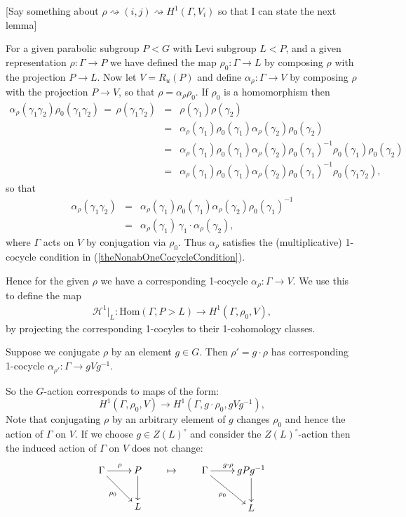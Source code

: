 [Say something about $\rho \rightsquigarrow (i,j) \rightsquigarrow H^1(\Gamma,V_i)$ so that I can state the next lemma]

For a given parabolic subgroup $P<G$ with Levi subgroup $L<P$, and a given representation $\rho:\Gamma\rightarrow P$ we have defined the map $\rho_0:\Gamma\rightarrow L$ by composing $\rho$ with the projection $P\rightarrow L$. Now let $V = R_u(P)$ and define $\alpha_\rho:\Gamma\rightarrow V$ by composing $\rho$ with the projection $P\rightarrow V$, so that $\rho = \alpha_\rho\rho_0$. If $\rho_0$ is a homomorphism then
\begin{eqnarray*}
	\alpha_\rho(\gamma_1\gamma_2)\rho_0(\gamma_1\gamma_2) \,=\, \rho(\gamma_1\gamma_2) 
		&=& \rho(\gamma_1)\rho(\gamma_2) \\
		&=& \alpha_\rho(\gamma_1)\rho_0(\gamma_1)\alpha_\rho(\gamma_2)\rho_0(\gamma_2) \\
		&=& \alpha_\rho(\gamma_1)\rho_0(\gamma_1)\alpha_\rho(\gamma_2)\rho_0(\gamma_1)^{-1}\rho_0(\gamma_1)\rho_0(\gamma_2)\\
		&=&\alpha_\rho(\gamma_1)\rho_0(\gamma_1)\alpha_\rho(\gamma_2)\rho_0(\gamma_1)^{-1}\rho_0(\gamma_1\gamma_2),
\end{eqnarray*}
so that
\begin{eqnarray*}
	\alpha_\rho(\gamma_1\gamma_2) &=&
	\alpha_\rho(\gamma_1)\rho_0(\gamma_1)\alpha_\rho(\gamma_2)\rho_0(\gamma_1)^{-1}\\
	&=& \alpha_\rho(\gamma_1)\,\gamma_1\cdot\alpha_\rho(\gamma_2),
\end{eqnarray*}
where $\Gamma$ acts on $V$ by conjugation via $\rho_0$. Thus $\alpha_\rho$ satisfies the (multiplicative) 1-cocycle condition in (\ref{theNonabOneCocycleCondition}).

Hence for the given $\rho$ we have a corresponding 1-cocycle $\alpha_\rho:\Gamma\rightarrow V$. We use this to define the map
\begin{eqnarray}\label{repToH1}
	\mathcal{H}^1|_L:\mathrm{Hom}(\Gamma, P>L) \rightarrow H^1(\Gamma, \rho_0, V),
\end{eqnarray}
by projecting the corresponding 1-cocyles to their 1-cohomology classes.

Suppose we conjugate $\rho$ by an element $g\in G$. Then $\rho'=g\cdot\rho$ has corresponding 1-cocycle $\alpha_{\rho'}:\Gamma\rightarrow gVg^{-1}$.

So the $G$-action corresponds to maps of the form:
\begin{displaymath}
	H^1(\Gamma, \rho_0, V)\rightarrow H^1(\Gamma, g\cdot\rho_0, gVg^{-1}),
\end{displaymath}
Note that conjugating $\rho$ by an arbitrary element of $g$ changes $\rho_0$ and hence the action of $\Gamma$ on $V$. If we choose $g\in Z(L)^\circ$ and consider the $Z(L)^\circ$-action then the induced action of $\Gamma$ on $V$ does not change:
\begin{displaymath}
	\xymatrix{
		\Gamma \ar[r]^{\rho} \ar[rd]_{\rho_0} & P \ar[d]\\
		& L} \qquad\mapsto\qquad
	\xymatrix{
		\Gamma \ar[r]^{g\cdot\rho} \ar[rd]_{\rho_0} & gPg^{-1} \ar[d]\\
		& L}
\end{displaymath} 


